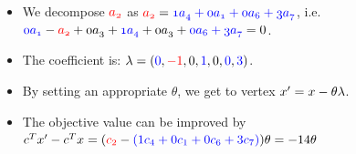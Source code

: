 \documentclass[mathserif]{beamer}
\begin{document}
{ \begin{itemize} 
 \item We decompose  $\textcolor{red}{\mathnormal{a_2}}$ as  $\mathnormal{\textcolor{red}{a_2} = \textcolor{blue}{1 a_4 + 0 a_1 + 0 a_6 + 3 a_7}}$, i.e. 
  $\mathnormal{\textcolor{blue}{0 a_1} - \textcolor{red}{a_2} + \textcolor{black}{0a_3} +  \textcolor{blue}{1a_4} +  \textcolor{black}{0a_3}  +  \textcolor{blue}{0 a_6 + 3 a_7} }=0$. 
  \item The coefficient is: $\lambda=(\textcolor{blue}{0}, \textcolor{red}{-1}, 0, \textcolor{blue}{1}, 0, \textcolor{blue}{0}, \textcolor{blue}{3})$.
  \item By setting an appropriate  $\theta$, we get to vertex $\mathnormal{x{'}=x}-\theta \lambda$. 
  \item The objective value can be improved by $\mathnormal{c^Tx{'}-c^Tx}=( \textcolor{red}{c_2}  - \textcolor{blue}{(1c_4 + 0c_1 + 0c_6 + 3c_7)} ) \theta= -14\theta$
\end{itemize}
}
\end{document}
